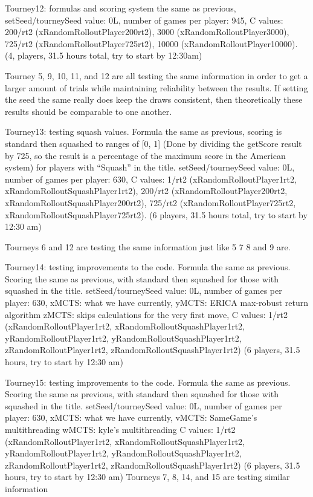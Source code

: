 \documentclass[letterpaper]{article}
\begin{document}
Tourney12: formulas and scoring system the same as previous, setSeed/tourneySeed value: 0L,  number of games per player: 945, C values:
200/rt2 (xRandomRolloutPlayer200rt2), 
3000 (xRandomRolloutPlayer3000), 
725/rt2 (xRandomRolloutPlayer725rt2), 
10000 (xRandomRolloutPlayer10000).  (4, players, 31.5 hours total, try to start by 12:30am)

Tourney 5, 9, 10, 11, and 12 are all testing the same information in order to get a larger amount of trials while maintaining reliability between the results. If setting the seed the same really does keep the draws consistent, then theoretically these results should be comparable to one another.

Tourney13: testing squash values. Formula the same as previous, scoring is standard then squashed to ranges of [0, 1] (Done by dividing the getScore result by 725, so the result is a percentage of the maximum score in the American system) for players with “Squash” in the title. setSeed/tourneySeed value: 0L, number of games per player: 630, C values: 
1/rt2 (xRandomRolloutPlayer1rt2, xRandomRolloutSquashPlayer1rt2),
200/rt2 (xRandomRolloutPlayer200rt2, xRandomRolloutSquashPlayer200rt2),
725/rt2 (xRandomRolloutPlayer725rt2, xRandomRolloutSquashPlayer725rt2). (6 players, 31.5 hours total, try to start by 12:30 am)

Tourneys 6 and 12 are testing the same information just like 5 7 8 and 9 are. 

Tourney14: testing improvements to the code. Formula the same as previous. Scoring the same as previous, with standard then squashed for those with squashed in the title. setSeed/tourneySeed value: 0L, number of games per player: 630,
	xMCTS: what we have currently,
	yMCTS: ERICA max-robust return algorithm
	zMCTS: skips calculations for the very first move,
C values: 
1/rt2 (xRandomRolloutPlayer1rt2, xRandomRolloutSquashPlayer1rt2, yRandomRolloutPlayer1rt2, yRandomRolloutSquashPlayer1rt2, 
zRandomRolloutPlayer1rt2, zRandomRolloutSquashPlayer1rt2) (6 players, 31.5 hours, try to start by 12:30 am)

Tourney15: testing improvements to the code. Formula the same as previous. Scoring the same as previous, with standard then squashed for those with squashed in the title. setSeed/tourneySeed value: 0L, number of games per player: 630,
	xMCTS: what we have currently,
	vMCTS: SameGame’s multithreading
	wMCTS: kyle’s multithreading 
C values: 
1/rt2 (xRandomRolloutPlayer1rt2, xRandomRolloutSquashPlayer1rt2, yRandomRolloutPlayer1rt2, yRandomRolloutSquashPlayer1rt2, 
zRandomRolloutPlayer1rt2, zRandomRolloutSquashPlayer1rt2) (6 players, 31.5 hours, try to start by 12:30 am)	
Tourneys 7, 8, 14, and 15 are testing similar information
\end{document}
